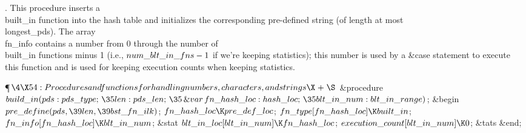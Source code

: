 .
This procedure inserts a \\{built\_in} function into the hash table and
initializes the corresponding pre-defined string (of length at most
\\{longest\_pds}).  The array \\{fn\_info} contains a number from 0 through
the number of \\{built\_in} functions minus 1 (i.e., $\\{num\_blt\_in\_fns}-1$
if we're keeping statistics); this number is used by a   \&{case}
statement to execute this function and is used for keeping execution
counts when keeping statistics.

\Y\P$\4\X54:Procedures and functions for handling numbers, characters, and
strings\X\mathrel{+}\S$\6
\4\&{procedure}\1\  $\\{build\_in}(\\{pds}:\\{pds\_type};\,\35\\{len}:\\{pds%
\_len};\,\35\mathop{\&{var}}\\{fn\_hash\_loc}:\\{hash\_loc};\,\35\\{blt\_in%
\_num}:\\{blt\_in\_range})$;\2\6
\&{begin} $\\{pre\_define}(\\{pds},\39\\{len},\39\\{bst\_fn\_ilk})$;\6
$\\{fn\_hash\_loc}\K\\{pre\_def\_loc}$;\6
$\\{fn\_type}[\\{fn\_hash\_loc}]\K\\{built\_in}$;\5
$\\{fn\_info}[\\{fn\_hash\_loc}]\K\\{blt\_in\_num}$;\6
\&{stat} $\\{blt\_in\_loc}[\\{blt\_in\_num}]\K\\{fn\_hash\_loc}$;\6
$\\{execution\_count}[\\{blt\_in\_num}]\K0$;\6
\&{tats}\6
\&{end};\par
\fi

